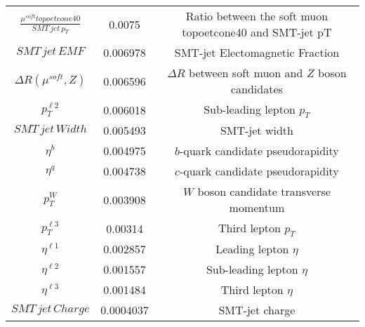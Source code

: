 \documentclass[a4paper]{article}
\begin{document}
\begin{tabular}{ccc}
$\frac{\mu^{soft} topoetcone40}{SMT\,jet\,p_{T}}$  &  0.0075  &  Ratio between the soft muon topoetcone40 and SMT-jet pT  \\
$SMT\,jet\,EMF$  &  0.006978  &  SMT-jet Electomagnetic Fraction  \\
$\Delta R(\mu^{soft},Z)$  &  0.006596  &  $\Delta R$ between soft muon and $Z$ boson candidates  \\
$p_{T}^{\ell2}$  &  0.006018  &  Sub-leading lepton $p_{T}$  \\
$SMT\,jet\,Width$  &  0.005493  &  SMT-jet width  \\
$\eta^{b}$  &  0.004975  &  $b$-quark candidate pseudorapidity  \\
$\eta^{q}$  &  0.004738  &  $c$-quark candidate pseudorapidity  \\
$p_{T}^{W}$  &  0.003908  &  $W$ boson candidate transverse momentum  \\
$p_{T}^{\ell3}$  &  0.00314  &  Third lepton $p_{T}$  \\
$\eta^{\ell1}$  &  0.002857  &  Leading lepton $\eta$  \\
$\eta^{\ell2}$  &  0.001557  &  Sub-leading lepton $\eta$  \\
$\eta^{\ell3}$  &  0.001484  &  Third lepton $\eta$  \\
$SMT\,jet\,Charge$  &  0.0004037  &  SMT-jet charge  \\
\bottomrule
\end{tabular}
\end{document}
